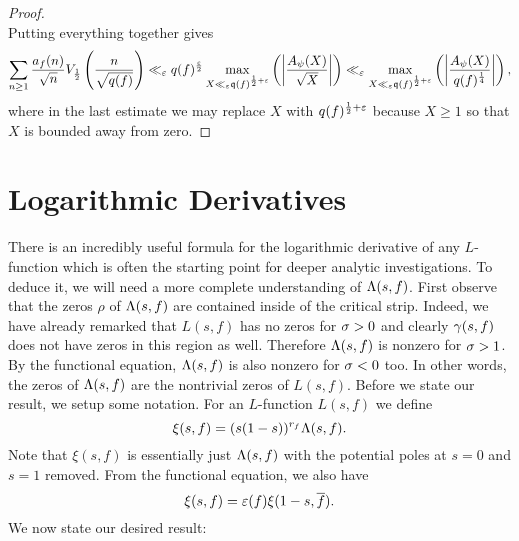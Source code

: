 \begin{proof}
\[      \]
      Putting everything together gives
      \[
        \sum_{n \ge 1}\frac{a_{f}(n)}{\sqrt{n}}V_{\frac{1}{2}}\left(\frac{n}{\sqrt{q(f)}}\right) \ll_{\varepsilon} q(f)^{\frac{\varepsilon}{2}}\max_{X \ll_{\varepsilon} \mathfrak{q}(f)^{\frac{1}{2}+\varepsilon}}\left(\left|\frac{A_{\psi}(X)}{\sqrt{X}}\right|\right) \ll_{\varepsilon} \max_{X \ll_{\varepsilon} \mathfrak{q}(f)^{\frac{1}{2}+\varepsilon}}\left(\left|\frac{A_{\psi}(X)}{q(f)^{\frac{1}{4}}}\right|\right),
      \]
      where in the last estimate we may replace $X$ with $q(f)^{\frac{1}{2}+\varepsilon}$ because $X \ge 1$ so that $X$ is bounded away from zero.
    \end{proof}
  \section{Logarithmic Derivatives}
    There is an incredibly useful formula for the logarithmic derivative of any $L$-function which is often the starting point for deeper analytic investigations. To deduce it, we will need a more complete understanding of $\Lambda(s,f)$. First observe that the zeros $\rho$ of $\Lambda(s,f)$ are contained inside of the critical strip. Indeed, we have already remarked that $L(s,f)$ has no zeros for $\sigma > 0$ and clearly $\gamma(s,f)$ does not have zeros in this region as well. Therefore $\Lambda(s,f)$ is nonzero for $\sigma > 1$. By the functional equation, $\Lambda(s,f)$ is also nonzero for $\sigma < 0$ too. In other words, the zeros of $\Lambda(s,f)$ are the nontrivial zeros of $L(s,f)$. Before we state our result, we setup some notation. For an $L$-function $L(s,f)$ we define
    \[
      \xi(s,f) = (s(1-s))^{r_{f}}\Lambda(s,f).
    \]
    Note that $\xi(s,f)$ is essentially just $\Lambda(s,f)$ with the potential poles at $s = 0$ and $s = 1$ removed. From the functional equation, we also have
    \[
      \xi(s,f) = \varepsilon(f)\xi(1-s,\overline{f}).
    \]
    We now state our desired result:

